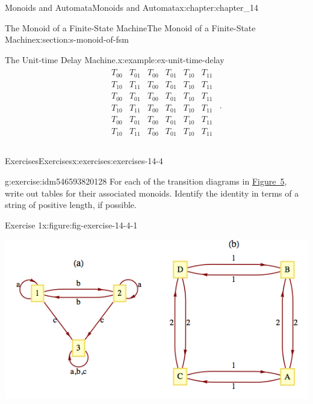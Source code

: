 \documentclass[oneside,10pt,]{book}
\numberwithin{equation}{section}
\begin{document}
\begin{chapterptx}{Monoids and Automata}{}{Monoids and Automata}{}{}{x:chapter:chapter_14}
\begin{sectionptx}{The Monoid of a Finite-State Machine}{}{The Monoid of a Finite-State Machine}{}{}{x:section:s-monoid-of-fsm}
\begin{example}{The Unit-time Delay Machine.}{x:example:ex-unit-time-delay}
\begin{equation*}
\begin{array}{c|c}
\begin{array}{c}
\end{array}
& 
\begin{array}{cccccc}
T_{00} & T_{01} & T_{00} & T_{01} & T_{10} & T_{11} \\
T_{10} & T_{11} & T_{00} & T_{01} & T_{10} & T_{11} \\
T_{00} & T_{01} & T_{00} & T_{01} & T_{10} & T_{11} \\
T_{10} & T_{11} & T_{00} & T_{01} & T_{10} & T_{11} \\
T_{00} & T_{01} & T_{00} & T_{01} & T_{10} & T_{11} \\
T_{10} & T_{11} & T_{00} & T_{01} & T_{10} & T_{11} \\
\end{array}
\\
\end{array}\text{.}
\end{equation*}
%
\end{example}
%
%
\typeout{************************************************}
\typeout{************************************************}
%
\begin{exercises-subsection}{Exercises}{}{Exercises}{}{}{x:exercises:exercises-14-4}
\begin{divisionexercise}{1}{}{}{g:exercise:idm546593820128}%
For each of the transition diagrams in \hyperref[x:figure:fig-exercise-14-4-1]{Figure~5}, write out tables for their associated monoids. Identify the identity in terms of a string of positive length, if possible.%
\begin{figureptx}{Exercise 1}{x:figure:fig-exercise-14-4-1}{}%
\begin{image}{0.15}{0.7}{0.15}%
\includegraphics[width=\linewidth]{images/fig-exercise-14-4-1.png}
\end{image}%
\tcblower
\end{figureptx}%
\par\smallskip%

\end{divisionexercise}
\end{exercises-subsection}
\end{sectionptx}
\end{chapterptx}
\end{document}
